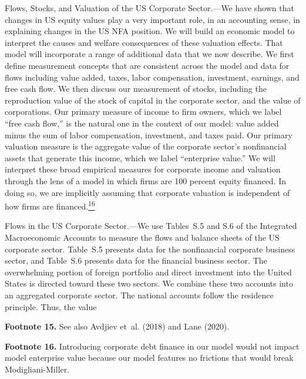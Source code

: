 \documentclass[11pt]{article}
\begin{document}
Flows, Stocks, and Valuation of the US Corporate Sector.—We have shown that changes in US equity values play a very important role, in an accounting sense, in explaining changes in the US NFA position. We will build an economic model to interpret the causes and welfare consequences of these valuation effects. That model will incorporate a range of additional data that we now describe. We first define measurement concepts that are consistent across the model and data for flows including value added, taxes, labor compensation, investment, earnings, and free cash flow. We then discuss our measurement of stocks, including the reproduction value of the stock of capital in the corporate sector, and the value of corporations. Our primary measure of income to firm owners, which we label “free cash flow,” is the natural one in the context of our model: value added minus the sum of labor compensation, investment, and taxes paid. Our primary valuation measure is the aggregate value of the corporate sector’s nonfinancial assets that generate this income, which we label “enterprise value.” We will interpret these broad empirical measures for corporate income and valuation through the lens of a model in which firms are 100 percent equity financed. In doing so, we are implicitly assuming that corporate valuation is independent of how firms are financed.\hyperlink{fn:16}{\textsuperscript{16}}


Flows in the US Corporate Sector.—We use Tables S.5 and S.6 of the Integrated Macroeconomic Accounts to measure the flows and balance sheets of the US corporate sector. Table S.5 presents data for the nonfinancial corporate business sector, and Table S.6 presents data for the financial business sector. The overwhelming portion of foreign portfolio and direct investment into the United States is directed toward these two sectors. We combine these two accounts into an aggregated corporate sector. The national accounts follow the residence principle. Thus, the value


{\footnotesize \hypertarget{fn:15}{}\textbf{Footnote 15.} See also Avdjiev et al. (2018) and Lane (2020).\par}

{\footnotesize\hypertarget{fn:16}{}\textbf{Footnote 16.} Introducing corporate debt finance in our model would not impact model enterprise value because our model features no frictions that would break Modigliani-Miller.\par}
\end{document}
